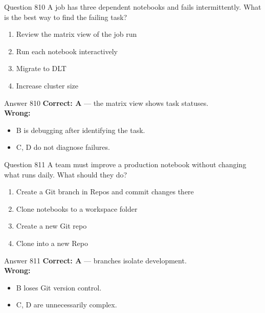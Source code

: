 \documentclass[aspectratio=169,11pt]{beamer}
\begin{document}
	\begin{frame}{Question 810}
		A job has three dependent notebooks and fails intermittently. What is the best way to find the failing task?
		\begin{enumerate}[label=\Alph*.]
			\item Review the matrix view of the job run
			\item Run each notebook interactively
			\item Migrate to DLT
			\item Increase cluster size
		\end{enumerate}
	\end{frame}
	\begin{frame}{Answer 810}
		\textbf{Correct: A} --- the matrix view shows task statuses.\\
		\vspace{0.5em}
		\textbf{Wrong:}
		\begin{itemize}
			\item B is debugging after identifying the task.
			\item C, D do not diagnose failures.
		\end{itemize}
	\end{frame}
	
	\begin{frame}{Question 811}
		A team must improve a production notebook without changing what runs daily. What should they do?
		\begin{enumerate}[label=\Alph*.]
			\item Create a Git branch in Repos and commit changes there
			\item Clone notebooks to a workspace folder
			\item Create a new Git repo
			\item Clone into a new Repo
		\end{enumerate}
	\end{frame}
	\begin{frame}{Answer 811}
		\textbf{Correct: A} --- branches isolate development.\\
		\vspace{0.5em}
		\textbf{Wrong:}
		\begin{itemize}
			\item B loses Git version control.
			\item C, D are unnecessarily complex.
		\end{itemize}
	\end{frame}
	
\end{document}
